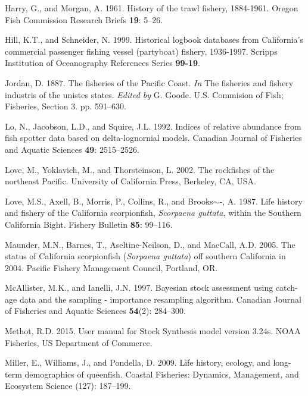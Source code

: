 \documentclass[12pt,]{article}
\begin{document}
\hypertarget{ref-Harry1961}{}
Harry, G., and Morgan, A. 1961. History of the trawl fishery, 1884-1961.
Oregon Fish Commission Research Briefs \textbf{19}: 5--26.

\hypertarget{ref-Hill1999}{}
Hill, K.T., and Schneider, N. 1999. Historical logbook databases from
California's commercial passenger fishing vessel (partyboat) fishery,
1936-1997. Scripps Institution of Oceanography References Series
\textbf{99-19}.

\hypertarget{ref-Jordan1887}{}
Jordan, D. 1887. The fisheries of the Pacific Coast. \emph{In} The
fisheries and fishery industris of the unistes states. \emph{Edited by}
G. Goode. U.S. Commision of Fish; Fisheries, Section 3. pp. 591--630.

\hypertarget{ref-Lo1992}{}
Lo, N., Jacobson, L.D., and Squire, J.L. 1992. Indices of relative
abundance from fish spotter data based on delta-lognornial models.
Canadian Journal of Fisheries and Aquatic Sciences \textbf{49}:
2515--2526.

\hypertarget{ref-Love2002}{}
Love, M., Yoklavich, M., and Thorsteinson, L. 2002. The rockfishes of
the northeast Pacific. University of California Press, Berkeley, CA,
USA.

\hypertarget{ref-Love1987}{}
Love, M.S., Axell, B., Morris, P., Collins, R., and Brooks\(\sim\)-, A.
1987. Life history and fishery of the California scorpionfish,
\emph{Scorpaena guttata}, within the Southern California Bight. Fishery
Bulletin \textbf{85}: 99--116.

\hypertarget{ref-Maunder2005}{}
Maunder, M.N., Barnes, T., Aseltine-Neilson, D., and MacCall, A.D. 2005.
The status of California scorpionfish (\emph{Sorpaena guttata}) off
southern California in 2004. Pacific Fishery Management Council,
Portland, OR.

\hypertarget{ref-McAllister1997}{}
McAllister, M.K., and Ianelli, J.N. 1997. Bayesian stock assessment
using catch-age data and the sampling - importance resampling algorithm.
Canadian Journal of Fisheries and Aquatic Sciences \textbf{54}(2):
284--300.

\hypertarget{ref-Methot2015}{}
Methot, R.D. 2015. User manual for Stock Synthesis model version 3.24s.
NOAA Fisheries, US Department of Commerce.

\hypertarget{ref-Miller2009}{}
Miller, E., Williams, J., and Pondella, D. 2009. Life history, ecology,
and long-term demographics of queenfish. Coastal Fisheries: Dynamics,
Management, and Ecosystem Science (127): 187--199.
\end{document}
